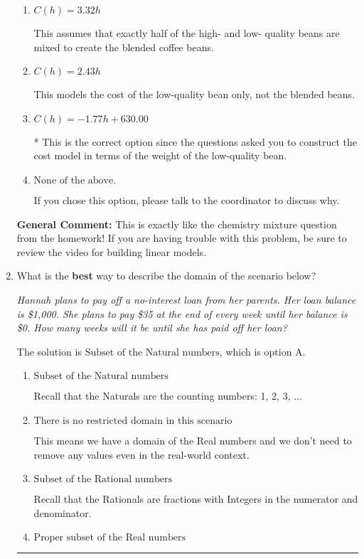 \documentclass{extbook}[14pt]
\newcommand{\litem}[1]{\item #1

\rule{\textwidth}{0.4pt}}
\begin{document}
\begin{enumerate}
{\begin{enumerate}[label=\Alph*.]
This would be correct if the question asked you to construct the cost model in terms of the weight of the high-quality bean.
\item \( C(h) = 3.32 h \)

This assumes that exactly half of the high- and low- quality beans are mixed to create the blended coffee beans.
\item \( C(h) = 2.43 h \)

This models the cost of the low-quality bean only, not the blended beans.
\item \( C(h) = -1.77 h + 630.00 \)

* This is the correct option since the questions asked you to construct the cost model in terms of the weight of the low-quality bean.
\item \( \text{None of the above.} \)

If you chose this option, please talk to the coordinator to discuss why.
\end{enumerate}

\textbf{General Comment:} This is exactly like the chemistry mixture question from the homework! If you are having trouble with this problem, be sure to review the video for building linear models.
}
\litem{
What is the \textbf{best} way to describe the domain of the scenario below?

\begin{center}
    \textit{ Hannah plans to pay off a no-interest loan from her parents. Her loan balance is \$1,000. She plans to pay \$35 at the end of every week until her balance is \$0. How many weeks will it be until she has paid off her loan? }
\end{center}
The solution is \( \text{Subset of the Natural numbers} \), which is option A.\begin{enumerate}[label=\Alph*.]
\item \( \text{Subset of the Natural numbers} \)

Recall that the Naturals are the counting numbers: 1, 2, 3, ...
\item \( \text{There is no restricted domain in this scenario} \)

This means we have a domain of the Real numbers and we don't need to remove any values even in the real-world context.
\item \( \text{Subset of the Rational numbers} \)

Recall that the Rationals are fractions with Integers in the numerator and denominator.
\item \( \text{Proper subset of the Real numbers} \)


\end{enumerate}}
\end{enumerate}
\end{document}
